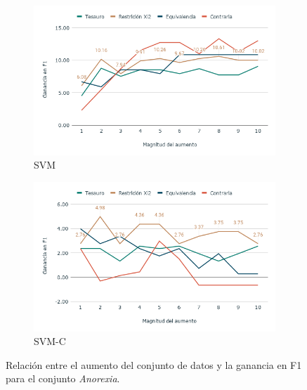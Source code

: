 \begin{figure}[hbt!]
    \begin{subfigure}[b]{0.5\textwidth}
        \includegraphics[width=\textwidth]{sections/figures/SVMAnox.png}
        \caption{SVM}
    \end{subfigure}
    \begin{subfigure}[b]{0.5\textwidth}
        \includegraphics[width=\textwidth]{sections/figures/SVM-CAnox.png}
        \caption{SVM-C}
    \end{subfigure}
    
    \caption{Relación entre el aumento del conjunto de datos y la ganancia en F1 para el conjunto \textit{Anorexia}.}
    \label{fig:aumento_n_anorexia}
\end{figure}